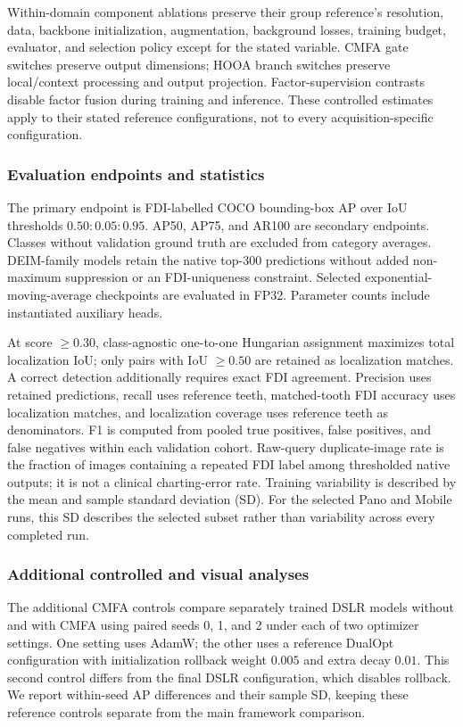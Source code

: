 \documentclass[a4paper,fleqn]{cas-dc}
\begin{document}
Within-domain component ablations preserve their group reference's resolution, data, backbone initialization, augmentation, background losses, training budget, evaluator, and selection policy except for the stated variable. CMFA gate switches preserve output dimensions; HOOA branch switches preserve local/context processing and output projection. Factor-supervision contrasts disable factor fusion during training and inference. These controlled estimates apply to their stated reference configurations, not to every acquisition-specific configuration.

\subsubsection{Evaluation endpoints and statistics}
The primary endpoint is FDI-labelled COCO bounding-box AP over IoU thresholds $0.50{:}0.05{:}0.95$. AP50, AP75, and AR100 are secondary endpoints. Classes without validation ground truth are excluded from category averages. DEIM-family models retain the native top-300 predictions without added non-maximum suppression or an FDI-uniqueness constraint. Selected exponential-moving-average checkpoints are evaluated in FP32. Parameter counts include instantiated auxiliary heads.

At score $\geq0.30$, class-agnostic one-to-one Hungarian assignment maximizes total localization IoU; only pairs with IoU $\geq0.50$ are retained as localization matches. A correct detection additionally requires exact FDI agreement. Precision uses retained predictions, recall uses reference teeth, matched-tooth FDI accuracy uses localization matches, and localization coverage uses reference teeth as denominators. F1 is computed from pooled true positives, false positives, and false negatives within each validation cohort. Raw-query duplicate-image rate is the fraction of images containing a repeated FDI label among thresholded native outputs; it is not a clinical charting-error rate. Training variability is described by the mean and sample standard deviation (SD). For the selected Pano and Mobile runs, this SD describes the selected subset rather than variability across every completed run.


\subsubsection{Additional controlled and visual analyses}
\label{sec:additional-design}
The additional CMFA controls compare separately trained DSLR models without and with CMFA using paired seeds 0, 1, and 2 under each of two optimizer settings. One setting uses AdamW; the other uses a reference DualOpt configuration with initialization rollback weight $0.005$ and extra decay $0.01$. This second control differs from the final DSLR configuration, which disables rollback. We report within-seed AP differences and their sample SD, keeping these reference controls separate from the main framework comparison.
\end{document}
